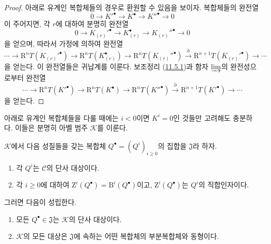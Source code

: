 \begin{proof}
아래로 유계인 복합체들의 경우로 환원할 수 있음을 보이자. 복합체들의
완전열
\[
  0\longrightarrow K'^\bullet\longrightarrow K^\bullet
  \longrightarrow K''^\bullet\longrightarrow0
\]
이 주어지면, 각 $r$에 대하여 분명히 완전열
\[
  0\longrightarrow K_{(r)}'^\bullet\longrightarrow K_{(r)}^\bullet
  \longrightarrow K_{(r)}''^\bullet\longrightarrow0
\]
을 얻으며, 따라서 가정에 의하여 완전열
\[
  \cdots\longrightarrow\mathrm R^nT(K_{(r)}'^\bullet)
  \longrightarrow\mathrm R^nT(K_{(r)}^\bullet)
  \longrightarrow\mathrm R^nT(K_{(r)}''^\bullet)
  \xrightarrow{\partial}\mathrm R^{n+1}T(K_{(r)}'^\bullet)
  \longrightarrow\cdots
\]
을 얻는다. 이 완전열들은 귀납계를 이룬다. 보조정리
(\hyperref[0.11.5.1-ko]{11.5.1})과 함자 $\varinjlim$의 완전성으로부터
완전열
\[
  \cdots\longrightarrow\mathrm R^nT(K'^\bullet)
  \longrightarrow\mathrm R^nT(K^\bullet)
  \longrightarrow\mathrm R^nT(K''^\bullet)
  \xrightarrow{\partial}\mathrm R^{n+1}T(K'^\bullet)
  \longrightarrow\cdots
\]
을 얻는다.
\end{proof}

아래로 유계인 복합체들을 다룰 때에는 $i<0$이면 $K^i=0$인 것들만
고려해도 충분하다. 이들은 분명히 아벨 범주 $\mathcal K$를 이룬다.

\begin{lemma}[11.5.2.1]
\label{0.11.5.2.1-ko}
$\mathcal K$에서 다음 성질들을 갖는 복합체
$Q^\bullet=(Q^i)_{i\geq0}$의 집합을 $\mathfrak J$라 하자.
\begin{enumerate}
  \item[$1^\circ$] 각 $Q^i$는 $\mathcal C$의 단사 대상이다.
  \item[$2^\circ$] 각 $i\geq0$에 대하여
    $\mathrm Z^i(Q^\bullet)=\mathrm B^i(Q^\bullet)$이고,
    $\mathrm Z^i(Q^\bullet)$는 $Q^i$의 직합인자이다.
\end{enumerate}
그러면 다음이 성립한다.
\begin{enumerate}
  \item[(i)] 모든 $Q^\bullet\in\mathfrak J$는 $\mathcal K$의 단사
    대상이다.
  \item[(ii)] $\mathcal K$의 모든 대상은 $\mathfrak J$에 속하는 어떤
    복합체의 부분복합체와 동형이다.
\end{enumerate}
\end{lemma}

